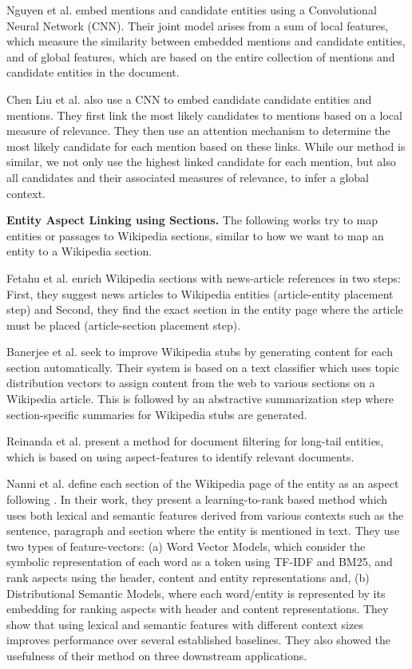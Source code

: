 Nguyen et al. \cite{nguyen2016joint} embed mentions and candidate entities using a Convolutional Neural Network (CNN). Their joint model arises from a sum of local features, which measure the similarity between embedded mentions and candidate entities, and of global features, which are based on the entire collection of mentions and candidate entities in the document.

Chen Liu et al. \cite{liu2019attention} also use a CNN to embed candidate candidate entities and mentions. They first link the most likely candidates to mentions based on a local measure of relevance. They then use an attention mechanism to determine the most likely candidate for each mention based on these links. While our method is similar, we not only use the highest linked candidate for each mention, but also all candidates and their associated measures of relevance, to infer a global context.

\textbf{Entity Aspect Linking using Sections.} 
The following works try to map entities or passages to Wikipedia sections, similar to how we want to map an entity to a Wikipedia section.

Fetahu et al. \cite{fetahu2015automated} enrich Wikipedia sections with news-article references in two steps: First, they suggest news articles to Wikipedia entities (article-entity placement step) and Second, they find the exact section in the entity page where the article must be placed (article-section placement step).

Banerjee et al. \cite{banerjee2015wikikreator} seek to improve Wikipedia stubs by generating content for each section automatically. Their system is based on a text classifier which uses topic distribution vectors to assign content from the web to various sections on a Wikipedia article. This is followed by an abstractive summarization step where section-specific summaries for Wikipedia stubs are generated.

Reinanda et al. \cite{reinanda2016document} present a method for document filtering for long-tail entities, which is based on using aspect-features to identify relevant documents. 

Nanni et al. \cite{nanni2018entity} define each section of the Wikipedia page of the entity as an aspect following \cite{fetahu2015automated,banerjee2015wikikreator,reinanda2016document}.
In their work, they present a learning-to-rank based method which uses both lexical and semantic features derived from various contexts such as the sentence, paragraph and section where the entity is mentioned in text. They use two types of feature-vectors: (a) Word Vector Models, which consider the symbolic representation of each word as a token using TF-IDF and BM25, and rank aspects using the header, content and entity representations and, (b) Distributional Semantic Models, where each word/entity is represented by its embedding for ranking aspects with header and content representations. They show that using lexical and semantic features with different context sizes improves performance over several established baselines. They also showed the usefulness of their method on three downstream applications.  


